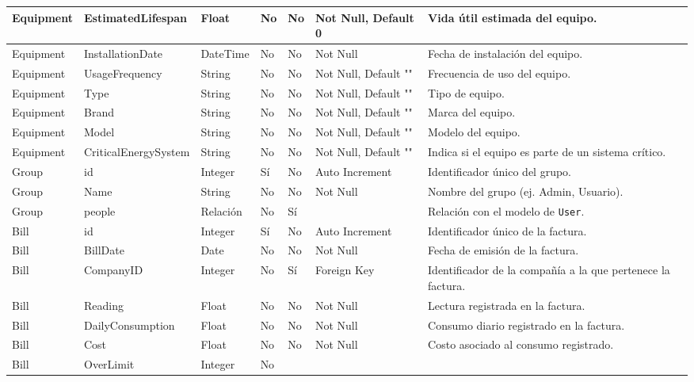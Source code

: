 \documentclass[12pt]{article}
\begin{document}
\begin{longtable}{|l|l|l|l|l|l|l|}
    Equipment & EstimatedLifespan & Float & No & No & Not Null, Default 0 & Vida útil estimada del equipo. \\
    \hline
    Equipment & InstallationDate & DateTime & No & No & Not Null & Fecha de instalación del equipo. \\
    \hline
    Equipment & UsageFrequency & String & No & No & Not Null, Default "" & Frecuencia de uso del equipo. \\
    \hline
    Equipment & Type & String & No & No & Not Null, Default "" & Tipo de equipo. \\
    \hline
    Equipment & Brand & String & No & No & Not Null, Default "" & Marca del equipo. \\
    \hline
    Equipment & Model & String & No & No & Not Null, Default "" & Modelo del equipo. \\
    \hline
    Equipment & CriticalEnergySystem & String & No & No & Not Null, Default "" & Indica si el equipo es parte de un sistema crítico. \\
    \hline
    Group & id & Integer & Sí & No & Auto Increment & Identificador único del grupo. \\
    \hline
    Group & Name & String & No & No & Not Null & Nombre del grupo (ej. Admin, Usuario). \\
    \hline
    Group & people & Relación & No & Sí & & Relación con el modelo de \texttt{User}. \\
    \hline
    Bill & id & Integer & Sí & No & Auto Increment & Identificador único de la factura. \\
    \hline
    Bill & BillDate & Date & No & No & Not Null & Fecha de emisión de la factura. \\
    \hline
    Bill & CompanyID & Integer & No & Sí & Foreign Key & Identificador de la compañía a la que pertenece la factura. \\
    \hline
    Bill & Reading & Float & No & No & Not Null & Lectura registrada en la factura. \\
    \hline
    Bill & DailyConsumption & Float & No & No & Not Null & Consumo diario registrado en la factura. \\
    \hline
    Bill & Cost & Float & No & No & Not Null & Costo asociado al consumo registrado. \\
    \hline
    Bill & OverLimit & Integer & No

\end{longtable}
\end{document}
